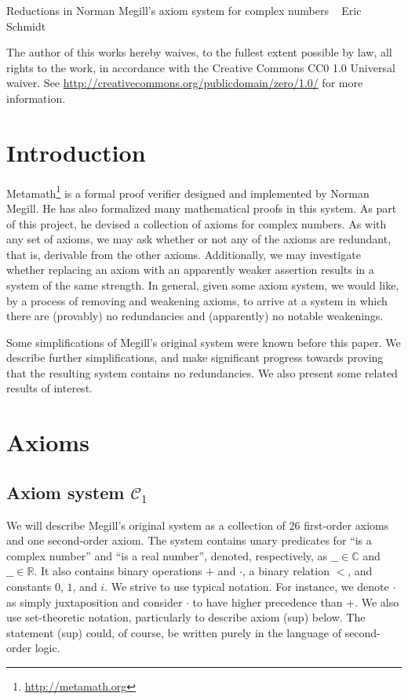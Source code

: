 \documentclass{article}
\newcommand\bC{\mathbb{C}}
\newcommand\bR{\mathbb{R}}
\newcommand\cC{\mathcal{C}}
\begin{document}
\begin{center}
{\Large Reductions in Norman Megill's axiom system for complex numbers}\newline
\ \newline
Eric Schmidt
\end{center}
The author of this works hereby waives, to the fullest extent possible by law, all rights to the work, in accordance with the Creative Commons CC0 1.0 Universal waiver. See \url{http://creativecommons.org/publicdomain/zero/1.0/} for more information.

\section{Introduction}

Metamath\footnote{\url{http://metamath.org}} is a formal proof verifier designed and implemented by Norman Megill. He has also formalized many mathematical proofs in this system. As part of this project, he devised a collection of axioms for complex numbers. As with any set of axioms, we may ask whether or not any of the axioms are redundant, that is, derivable from the other axioms. Additionally, we may investigate whether replacing an axiom with an apparently weaker assertion results in a system of the same strength. In general, given some axiom system, we would like, by a process of removing and weakening axioms, to arrive at a system in which there are (provably) no redundancies and (apparently) no notable weakenings.

Some simplifications of Megill's original system were known before this paper. We describe further simplifications, and make significant progress towards proving that the resulting system contains no redundancies. We also present some related results of interest.

\section{Axioms}

\subsection{Axiom system $\cC_1$}
We will describe Megill's original system as a collection of 26 first-order axioms and one second-order axiom. The system contains unary predicates for ``is a complex number'' and ``is a real number'', denoted, respectively, as $\_\_ \in \bC$ and $\_\_ \in \bR$. It also contains binary operations $+$ and $\cdot$, a binary relation $<$, and constants $0$, $1$, and $i$. We strive to use typical notation. For instance, we denote $\cdot$ as simply juxtaposition and consider $\cdot$ to have higher precedence than $+$. We also use set-theoretic notation, particularly to describe axiom (sup) below. The statement (sup) could, of course, be written purely in the language of second-order logic.
\end{document}
